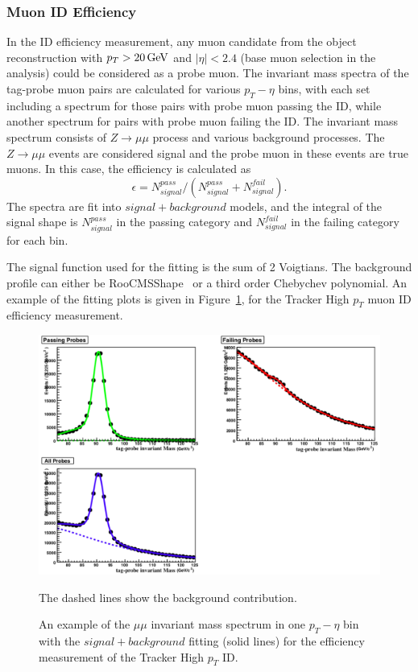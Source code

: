 \subsubsection{Muon ID Efficiency}
In the ID efficiency measurement, any muon candidate from the object reconstruction with $p_T > 20\,\text{Ge\hspace{-.08em}V}$ and $|\eta|<2.4$ (base muon selection in the analysis) could be considered as a probe muon. The invariant mass spectra of the tag-probe muon pairs are calculated for various $p_T - \eta$ bins, with each set including a spectrum for those pairs with probe muon passing the ID, while another spectrum for pairs with probe muon failing the ID. The invariant mass spectrum consists of $Z\rightarrow \mu\mu$ process and various background processes. The $Z\rightarrow \mu\mu$ events are considered signal and the probe muon in these events are true muons. In this case, the efficiency is calculated as
\begin{equation}
\epsilon=N_{signal}^{pass}/(N_{signal}^{pass}+N_{signal}^{fail}). 
\end{equation}
The spectra are fit into $signal+background$ models, and the integral of the signal shape is $N_{signal}^{pass}$ in the passing category and $N_{signal}^{fail}$ in the failing category for each bin. 

\vspace{0.3cm}
The signal function used for the fitting is the sum of 2 Voigtians. The background profile can either be RooCMSShape~\cite{bg_cmsshape} or a third order Chebychev polynomial. An example of the fitting plots is given in Figure~\ref{fig:bg_tnpmuonid}, for the Tracker High $p_T$ muon ID efficiency measurement.
\begin{figure}[htbp]
\begin{center}
\includegraphics[width=0.9\linewidth]{figures/bg_tnpmuonid.png}
\caption{An example of the $\mu\mu$ invariant mass spectrum in one $p_T - \eta$ bin with the $signal+background$ fitting (solid lines) for the efficiency measurement of the Tracker High $p_T$ ID.} The dashed lines show the background contribution.
\label{fig:bg_tnpmuonid}
\end{center}
\end{figure}

